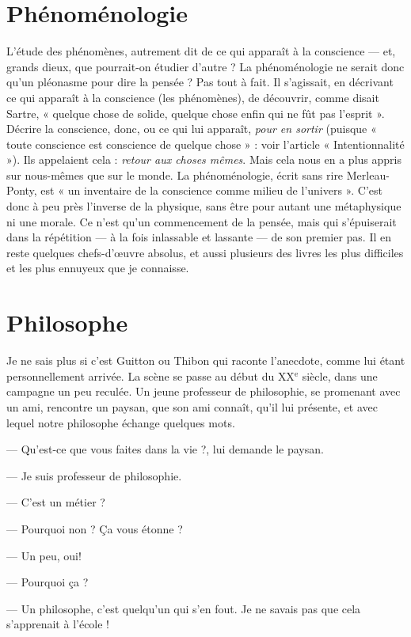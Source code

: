\section{Phénoménologie}
L'étude des phénomènes, autrement dit de ce qui
apparaît à la conscience — et, grands dieux, que
pourrait-on étudier d’autre ? La phénoménologie ne serait donc qu’un pléonasme
pour dire la pensée ? Pas tout à fait. Il s’agissait, en décrivant ce qui
apparaît à la conscience (les phénomènes), de découvrir, comme disait Sartre,
« quelque chose de solide, quelque chose enfin qui ne fût pas l'esprit ». Décrire
la conscience, donc, ou ce qui lui apparaît, {\it pour en sortir} (puisque « toute conscience
est conscience de quelque chose » : voir l’article « Intentionnalité »). Ils
appelaient cela : {\it retour aux choses mêmes}. Mais cela nous en a plus appris sur
nous-mêmes que sur le monde. La phénoménologie, écrit sans rire Merleau-Ponty,
est « un inventaire de la conscience comme milieu de l'univers ». C’est
donc à peu près l'inverse de la physique, sans être pour autant une métaphysique
ni une morale. Ce n’est qu’un commencement de la pensée, mais qui
s’épuiserait dans la répétition — à la fois inlassable et lassante — de son premier
pas. Il en reste quelques chefs-d’œuvre absolus, et aussi plusieurs des livres les
plus difficiles et les plus ennuyeux que je connaisse.

\section{Philosophe}
Je ne sais plus si c’est Guitton ou Thibon qui raconte l’anecdote,
comme lui étant personnellement arrivée. La scène se
passe au début du {\footnotesize XX$^\text{e}$} siècle, dans une campagne un peu reculée. Un jeune professeur
de philosophie, se promenant avec un ami, rencontre un paysan, que
son ami connaît, qu’il lui présente, et avec lequel notre philosophe échange
quelques mots.

— Qu'est-ce que vous faites dans la vie ?, lui demande le paysan.

— Je suis professeur de philosophie.

— C’est un métier ?

— Pourquoi non ? Ça vous étonne ?

— Un peu, oui!

— Pourquoi ça ?

— Un philosophe, c’est quelqu'un qui s’en fout. Je ne savais pas que cela
s’apprenait à l’école !


